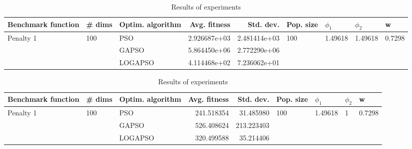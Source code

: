 \documentclass{article}
\begin{document}
\begin{table}
\centering
\caption{Results of experiments}
\begin{tabular}{lllrrllll}
\toprule
        Benchmark function &              \# dims & Optim. algorithm &  Avg. fitness &    Std. dev. &            Pop. size &               $\phi_{1}$ &               $\phi_{2}$ &                       w \\
\midrule
\multirow{3}{*}{Penalty 1} & \multirow{3}{*}{100} &              PSO &  2.926687e+03 & 2.481414e+03 & \multirow{3}{*}{100} & \multirow{3}{*}{1.49618} & \multirow{3}{*}{1.49618} & \multirow{3}{*}{0.7298} \\
                           &                      &            GAPSO &  5.864450e+06 & 2.772290e+06 &                      &                          &                          &                         \\
                           &                      &          LOGAPSO &  4.114468e+02 & 7.236062e+01 &                      &                          &                          &                         \\
\bottomrule
\end{tabular}
\end{table}
\begin{table}
\centering
\caption{Results of experiments}
\begin{tabular}{lllrrllll}
\toprule
        Benchmark function &              \# dims & Optim. algorithm &  Avg. fitness &  Std. dev. &            Pop. size &               $\phi_{1}$ &         $\phi_{2}$ &                       w \\
\midrule
\multirow{3}{*}{Penalty 1} & \multirow{3}{*}{100} &              PSO &    241.518354 &  31.485980 & \multirow{3}{*}{100} & \multirow{3}{*}{1.49618} & \multirow{3}{*}{1} & \multirow{3}{*}{0.7298} \\
                           &                      &            GAPSO &    526.408624 & 213.223403 &                      &                          &                    &                         \\
                           &                      &          LOGAPSO &    320.499588 &  35.214406 &                      &                          &                    &                         \\
\bottomrule
\end{tabular}
\end{table}
\end{document}
